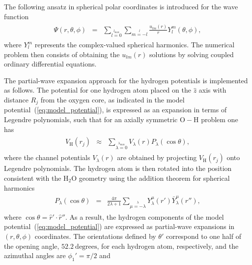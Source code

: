 The following ansatz in spherical polar coordinates is introduced for
the wave function
%
\begin{eqnarray}
  \begin{split}
    \Psi(r,\theta,\phi) & = & \sum\limits_{l=0}\limits^{l_{\mathrm{max}}}
    \sum\limits_{m=-l}\limits^{l} \frac{u_{lm}(r)}{r}
    Y_{l}^{m}(\theta, \phi),
  \end{split}
  \label{eq:spherical_anzats}
\end{eqnarray}
%
where $Y_{l}^{m}$ represents the complex-valued spherical
harmonics. The numerical problem then consists of obtaining the
$u_{lm}(r)$ solutions by solving coupled ordinary differential
equations.

The partial-wave expansion approach for the hydrogen potentials is
implemented as follows. The potential for one hydrogen atom placed on
the $\hat{z}$ axis with distance $R_{j}$ from the oxygen core, as
indicated in the model potential~(\ref{eq:model_potential}), is
expressed as an expansion in terms of Legendre polynomials, such that
for an axially symmetric $\mathrm{O}-\mathrm{H}$ problem one
has~\cite{marko_partialwave}
%
\begin{eqnarray}
  \begin{split}
    V_{\mathrm{H}}(r_{j}) & \approx & \sum\limits_{\lambda=0}
    \limits^{\lambda_{\mathrm{max}}} V_{\lambda}(r) P_{\lambda}(\cos\theta),
  \end{split}
  \label{eq:Legendre-pols}
\end{eqnarray}
%
where the channel potentials $V_{\lambda}(r)$ are obtained by
projecting $V_{\mathrm{H}}(r_{j})$ onto Legendre polynomials. The
hydrogen atom is then rotated into the position consistent with the
H$_{2}$O geometry using the addition theorem for spherical harmonics
%
\begin{eqnarray}
  \begin{split}
    P_{\lambda}(\cos\theta) & = & \frac{4\pi}{2\lambda + 1}
    \sum\limits_{\mu = -\lambda}\limits^{\lambda} Y_{\lambda}^{\mu}(\hat{r}')
    \bar{Y}_{\lambda}^{\mu}(\hat{r}''),
  \end{split}
  \label{eq:add_sphericalYlm}
\end{eqnarray}
%
where $\cos\theta = \hat{r}'\cdot\hat{r}''$. As a result, the hydrogen
components of the model potential~(\ref{eq:model_potential}) are
expressed as partial-wave expansions in $(r,\theta,\phi)$
coordinates. The orientations defined by $\theta'$ correspond to one
half of the opening angle, $52.2\ \mathrm{degrees}$, for each hydrogen
atom, respectively, and the azimuthal angles are $\phi_{1}'=\pi/2$ and
